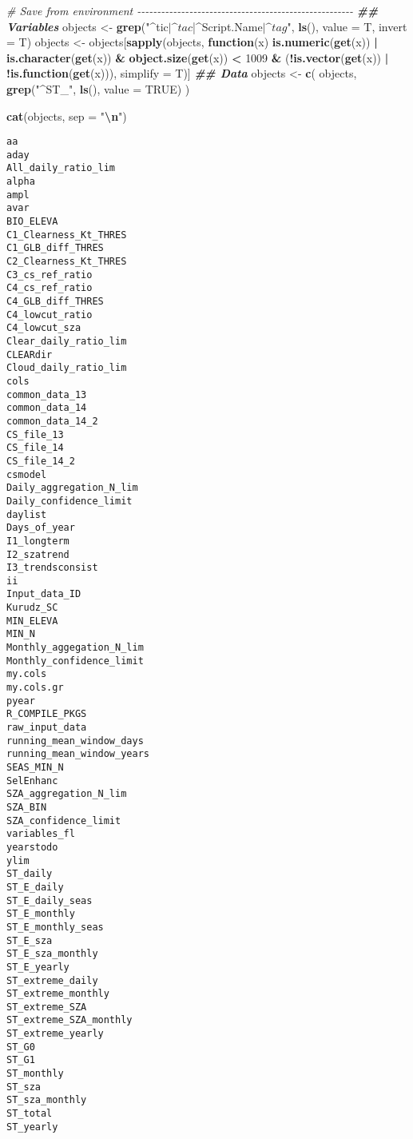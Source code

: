 \documentclass[
  10pt,
  a4paper,oneside]{article}
\newenvironment{Shaded}{\begin{snugshade}}{\end{snugshade}}
\newcommand{\AttributeTok}[1]{\textcolor[rgb]{0.13,0.29,0.53}{#1}}
\newcommand{\CommentTok}[1]{\textcolor[rgb]{0.56,0.35,0.01}{\textit{#1}}}
\newcommand{\ConstantTok}[1]{\textcolor[rgb]{0.56,0.35,0.01}{#1}}
\newcommand{\ControlFlowTok}[1]{\textcolor[rgb]{0.13,0.29,0.53}{\textbf{#1}}}
\newcommand{\DecValTok}[1]{\textcolor[rgb]{0.00,0.00,0.81}{#1}}
\newcommand{\DocumentationTok}[1]{\textcolor[rgb]{0.56,0.35,0.01}{\textbf{\textit{#1}}}}
\newcommand{\FunctionTok}[1]{\textcolor[rgb]{0.13,0.29,0.53}{\textbf{#1}}}
\newcommand{\NormalTok}[1]{#1}
\newcommand{\OtherTok}[1]{\textcolor[rgb]{0.56,0.35,0.01}{#1}}
\newcommand{\SpecialCharTok}[1]{\textcolor[rgb]{0.81,0.36,0.00}{\textbf{#1}}}
\newcommand{\StringTok}[1]{\textcolor[rgb]{0.31,0.60,0.02}{#1}}
\begin{document}
\begin{Shaded}
\begin{Highlighting}[]
\CommentTok{\#  Save from environment  {-}{-}{-}{-}{-}{-}{-}{-}{-}{-}{-}{-}{-}{-}{-}{-}{-}{-}{-}{-}{-}{-}{-}{-}{-}{-}{-}{-}{-}{-}{-}{-}{-}{-}{-}{-}{-}{-}{-}{-}{-}{-}{-}{-}{-}{-}{-}{-}{-}{-}{-}{-}{-}{-}}
\DocumentationTok{\#\# Variables}
\NormalTok{objects }\OtherTok{\textless{}{-}} \FunctionTok{grep}\NormalTok{(}\StringTok{"\^{}tic$|\^{}tac$|\^{}Script.Name$|\^{}tag$"}\NormalTok{, }\FunctionTok{ls}\NormalTok{(), }\AttributeTok{value =}\NormalTok{ T, }\AttributeTok{invert =}\NormalTok{ T)}
\NormalTok{objects }\OtherTok{\textless{}{-}}\NormalTok{ objects[}\FunctionTok{sapply}\NormalTok{(objects, }\ControlFlowTok{function}\NormalTok{(x)}
    \FunctionTok{is.numeric}\NormalTok{(}\FunctionTok{get}\NormalTok{(x)) }\SpecialCharTok{|}
        \FunctionTok{is.character}\NormalTok{(}\FunctionTok{get}\NormalTok{(x)) }\SpecialCharTok{\&}
        \FunctionTok{object.size}\NormalTok{(}\FunctionTok{get}\NormalTok{(x)) }\SpecialCharTok{\textless{}} \DecValTok{1009} \SpecialCharTok{\&}
\NormalTok{        (}\SpecialCharTok{!}\FunctionTok{is.vector}\NormalTok{(}\FunctionTok{get}\NormalTok{(x)) }\SpecialCharTok{|}
             \SpecialCharTok{!}\FunctionTok{is.function}\NormalTok{(}\FunctionTok{get}\NormalTok{(x))), }\AttributeTok{simplify =}\NormalTok{ T)]}
\DocumentationTok{\#\# Data}
\NormalTok{objects }\OtherTok{\textless{}{-}} \FunctionTok{c}\NormalTok{(}
\NormalTok{    objects,}
    \FunctionTok{grep}\NormalTok{(}\StringTok{"\^{}ST\_"}\NormalTok{, }\FunctionTok{ls}\NormalTok{(), }\AttributeTok{value =} \ConstantTok{TRUE}\NormalTok{)}
\NormalTok{)}



\FunctionTok{cat}\NormalTok{(objects, }\AttributeTok{sep =} \StringTok{"}\SpecialCharTok{\textbackslash{}n}\StringTok{"}\NormalTok{)}
\end{Highlighting}
\end{Shaded}

\begin{verbatim}
aa
aday
All_daily_ratio_lim
alpha
ampl
avar
BIO_ELEVA
C1_Clearness_Kt_THRES
C1_GLB_diff_THRES
C2_Clearness_Kt_THRES
C3_cs_ref_ratio
C4_cs_ref_ratio
C4_GLB_diff_THRES
C4_lowcut_ratio
C4_lowcut_sza
Clear_daily_ratio_lim
CLEARdir
Cloud_daily_ratio_lim
cols
common_data_13
common_data_14
common_data_14_2
CS_file_13
CS_file_14
CS_file_14_2
csmodel
Daily_aggregation_N_lim
Daily_confidence_limit
daylist
Days_of_year
I1_longterm
I2_szatrend
I3_trendsconsist
ii
Input_data_ID
Kurudz_SC
MIN_ELEVA
MIN_N
Monthly_aggegation_N_lim
Monthly_confidence_limit
my.cols
my.cols.gr
pyear
R_COMPILE_PKGS
raw_input_data
running_mean_window_days
running_mean_window_years
SEAS_MIN_N
SelEnhanc
SZA_aggregation_N_lim
SZA_BIN
SZA_confidence_limit
variables_fl
yearstodo
ylim
ST_daily
ST_E_daily
ST_E_daily_seas
ST_E_monthly
ST_E_monthly_seas
ST_E_sza
ST_E_sza_monthly
ST_E_yearly
ST_extreme_daily
ST_extreme_monthly
ST_extreme_SZA
ST_extreme_SZA_monthly
ST_extreme_yearly
ST_G0
ST_G1
ST_monthly
ST_sza
ST_sza_monthly
ST_total
ST_yearly
\end{verbatim}
\end{document}
